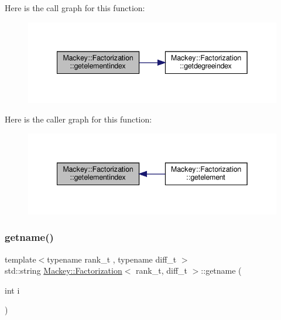 Here is the call graph for this function\+:\nopagebreak
\begin{figure}[H]
\begin{center}
\leavevmode
\includegraphics[width=342pt]{classMackey_1_1Factorization_a5217ad8ca4aaa13b900adda77893249b_cgraph}
\end{center}
\end{figure}
Here is the caller graph for this function\+:\nopagebreak
\begin{figure}[H]
\begin{center}
\leavevmode
\includegraphics[width=342pt]{classMackey_1_1Factorization_a5217ad8ca4aaa13b900adda77893249b_icgraph}
\end{center}
\end{figure}
\mbox{\label{classMackey_1_1Factorization_ac5088227511baaaec1f62802b75d3a9e}} 
\subsubsection{\texorpdfstring{getname()}{getname()}}
{\footnotesize\ttfamily template$<$typename rank\+\_\+t , typename diff\+\_\+t $>$ \\
std\+::string \hyperlink{classMackey_1_1Factorization}{Mackey\+::\+Factorization}$<$ rank\+\_\+t, diff\+\_\+t $>$\+::getname (\begin{DoxyParamCaption}\item[{int}]{i }\end{DoxyParamCaption})}



